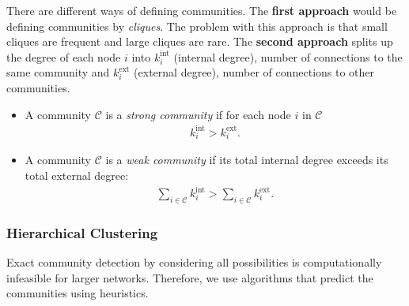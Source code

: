 \documentclass[english]{panikzettel}
\begin{document}
There are different ways of defining communities.
The \textbf{first approach} would be defining communities by \textit{cliques}.
The problem with this approach is that small cliques are frequent and large cliques are rare.
The \textbf{second approach} splits up the degree of each node $ i $ into $ k_i^\text{int} $ (internal degree), number of connections to the same community and $ k_i^\text{ext} $ (external degree), number of connections to other communities.
\begin{itemize}
	\item A community $ \mathcal{C} $ is a \textit{strong community} if for each node $ i $ in $ \mathcal{C} $
	\begin{align*}
		k_i^\text{int} > k_i^\text{ext}.
	\end{align*}
	\item A community $ \mathcal{C} $ is a \textit{weak community} if its total internal degree exceeds its total external degree:
	\begin{align*}
		\sum\limits_{i \in \mathcal{C}} k_i^\text{int} > \sum\limits_{i \in \mathcal{C}} k_i^\text{ext}.
	\end{align*}
\end{itemize}

\subsubsection{Hierarchical Clustering}
Exact community detection by considering all possibilities is computationally infeasible for larger networks.
Therefore, we use algorithms that predict the communities using heuristics.
\end{document}
